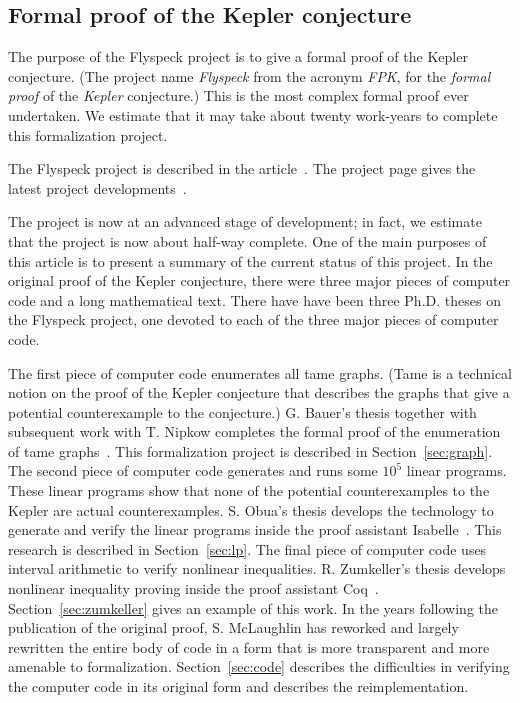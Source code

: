 \documentclass[11pt]{amsart}
\begin{document}
\subsection*{Formal proof of the Kepler conjecture}

The purpose of the Flyspeck project is to give a formal proof of the Kepler conjecture.  (The project name {\it Flyspeck} from the acronym {\it FPK}, for the {\it formal} {\it proof} of the {\it Kepler} conjecture.)  This is the most complex formal proof ever undertaken.  We estimate that it may take about twenty work-years to complete this formalization project.  

The Flyspeck project is described in the article~\cite{hales:DSP:2006:432}.
The project page gives the latest project developments~\cite{website:FlyspeckProject}.

The project is now at an advanced stage of development; in fact, we estimate that the project is now about half-way complete.  
One of the main purposes of this article is to present a summary of the current status of this project.
In the original proof of the Kepler conjecture, there were three major pieces of computer code and a long mathematical text.
There have have been three Ph.D. theses on the Flyspeck
project, one devoted to each of the three major pieces of computer code.

The first piece of computer code enumerates all tame graphs.
(Tame is a technical notion on the proof of the Kepler conjecture that
describes the graphs that give a potential counterexample to the conjecture.)
G. Bauer's thesis together with subsequent 
work with T. Nipkow completes the formal
proof of the enumeration of tame graphs~\cite{NipkowBS-IJCAR06}.
This formalization project is described in Section~\ref{sec:graph}.
The second piece of computer code generates and runs some $10^5$ linear
programs.   These linear programs show that none of the potential counterexamples
to the Kepler are actual counterexamples.  S. Obua's thesis develops the
technology to generate and verify the linear programs inside the proof assistant Isabelle~\cite{obua:phd}. 
 This research is described in Section~\ref{sec:lp}.
The final piece of computer code uses interval arithmetic to verify nonlinear inequalities.  R. Zumkeller's thesis develops nonlinear inequality proving inside the proof assistant Coq~\cite{roland-thesis}.  Section~\ref{sec:zumkeller} gives an example of this work.  In the years following the publication of the original proof, S. McLaughlin has  reworked and largely rewritten the entire body of code in a form that is more transparent and more amenable to formalization.  Section~\ref{sec:code} describes the difficulties
in verifying the computer code in its original form and
describes the reimplementation.
\end{document}
